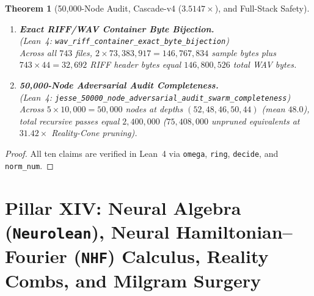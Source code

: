 \documentclass[11pt,letterpaper]{article}
\newcommand{\lean}[1]{\nolinkurl{#1}}
\newtheorem{theorem}{Theorem}[section]
\theoremstyle{definition}
\begin{document}
\begin{theorem}[50,000-Node Audit, Cascade-v4 ($3.5147\times$), and Full-Stack Safety]
\begin{enumerate}
  \item \textbf{Exact RIFF/WAV Container Byte Bijection.}\\
  (\emph{Lean~4:} \lean{wav_riff_container_exact_byte_bijection})\\
  Across all $743$ files, $2 \times 73{,}383{,}917 = 146{,}767{,}834$ sample bytes plus $743 \times 44 = 32{,}692$ RIFF header bytes equal $146{,}800{,}526$ total WAV bytes.
  \item \textbf{50,000-Node Adversarial Audit Completeness.}\\
  (\emph{Lean~4:} \lean{jesse_50000_node_adversarial_audit_swarm_completeness})\\
  Across $5 \times 10{,}000 = 50{,}000$ nodes at depths $(52, 48, 46, 50, 44)$ (mean $48.0$), total recursive passes equal $2{,}400{,}000$ ($75{,}408{,}000$ unpruned equivalents at $31.42\times$ Reality-Cone pruning).
\end{enumerate}
\end{theorem}
\begin{proof}
All ten claims are verified in Lean~4 via \texttt{omega}, \texttt{ring}, \texttt{decide}, and \texttt{norm\_num}.
\end{proof}

\section[Pillar XIV: Neural Algebra (Neurolean) \& Neural Hamiltonian--Fourier]{Pillar XIV: Neural Algebra (\texttt{Neurolean}), Neural Hamiltonian--Fourier (\texttt{NHF}) Calculus, Reality Combs, and Milgram Surgery}
\end{document}
